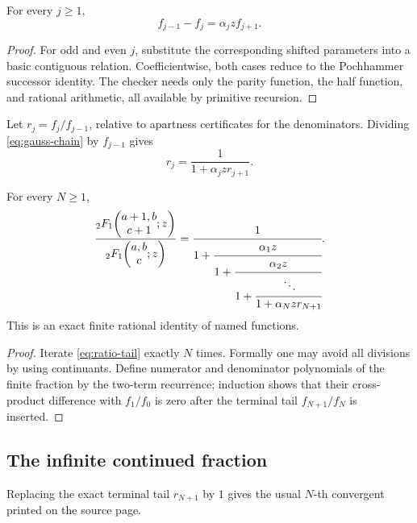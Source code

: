 \begin{lemma}\label{lem:gauss-chain}
For every \(j\ge1\),
\begin{equation}\label{eq:gauss-chain}
 f_{j-1}-f_j=\alpha_j z f_{j+1}.
\end{equation}
\end{lemma}

\begin{proof}
For odd and even \(j\), substitute the corresponding shifted parameters into
a basic contiguous relation.  Coefficientwise, both cases reduce to the
Pochhammer successor identity.  The checker needs only the parity function,
the half function, and rational arithmetic, all available by primitive
recursion.
\end{proof}

Let \(r_j=f_j/f_{j-1}\), relative to apartness certificates for the
denominators.  Dividing \eqref{eq:gauss-chain} by \(f_{j-1}\) gives
\begin{equation}\label{eq:ratio-tail}
 r_j=\frac1{1+\alpha_jzr_{j+1}}.
\end{equation}

\begin{theorem}\label{thm:finite-cf}
For every \(N\ge1\),
\begin{equation}\label{eq:finite-cf}
 \frac{{}_2F_1\!\left(\begin{matrix}a+1,b\\c+1\end{matrix};z\right)}{{}_2F_1\!\left(\begin{matrix}a,b\\c\end{matrix};z\right)}
 =\cfrac1{1+\cfrac{\alpha_1z}{1+\cfrac{\alpha_2z}{1+
 \cfrac{\ddots}{1+\alpha_Nzr_{N+1}}}}}.
\end{equation}
This is an exact finite rational identity of named functions.
\end{theorem}

\begin{proof}
Iterate \eqref{eq:ratio-tail} exactly \(N\) times.  Formally one may avoid all
divisions by using continuants.  Define numerator and denominator polynomials
of the finite fraction by the two-term recurrence; induction shows that their
cross-product difference with \(f_1/f_0\) is zero after the terminal tail
\(f_{N+1}/f_N\) is inserted.
\end{proof}

\subsection{The infinite continued fraction}

Replacing the exact terminal tail \(r_{N+1}\) by \(1\) gives the usual
\(N\)-th convergent printed on the source page.


